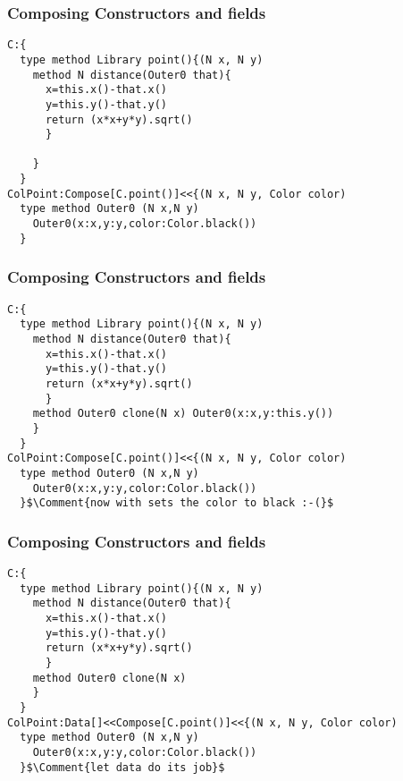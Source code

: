 \begin{frame}[fragile]
\frametitle{Composing Constructors and fields}


\begin{NiceCode}{59ex}{0.9}
\begin{lstlisting}
C:{
  type method Library point(){(N x, N y)
    method N distance(Outer0 that){
      x=this.x()-that.x()
      y=this.y()-that.y()
      return (x*x+y*y).sqrt()
      }

    }
  }
ColPoint:Compose[C.point()]<<{(N x, N y, Color color)
  type method Outer0 (N x,N y)
    Outer0(x:x,y:y,color:Color.black())
  }
\end{lstlisting}
\end{NiceCode}
\end{frame}

\begin{frame}[fragile]
\frametitle{Composing Constructors and fields}
\addtocounter{framenumber}{-1}

\begin{NiceCode}{59ex}{0.9}
\begin{lstlisting}
C:{
  type method Library point(){(N x, N y)
    method N distance(Outer0 that){
      x=this.x()-that.x()
      y=this.y()-that.y()
      return (x*x+y*y).sqrt()
      }
    method Outer0 clone(N x) Outer0(x:x,y:this.y())
    }
  }
ColPoint:Compose[C.point()]<<{(N x, N y, Color color)
  type method Outer0 (N x,N y)
    Outer0(x:x,y:y,color:Color.black())
  }$\Comment{now with sets the color to black :-(}$
\end{lstlisting}
\end{NiceCode}
\end{frame}

\begin{frame}[fragile]
\frametitle{Composing Constructors and fields}
\addtocounter{framenumber}{-1}

\begin{NiceCode}{59ex}{0.9}
\begin{lstlisting}
C:{
  type method Library point(){(N x, N y)
    method N distance(Outer0 that){
      x=this.x()-that.x()
      y=this.y()-that.y()
      return (x*x+y*y).sqrt()
      }
    method Outer0 clone(N x)
    }
  }
ColPoint:Data[]<<Compose[C.point()]<<{(N x, N y, Color color)
  type method Outer0 (N x,N y)
    Outer0(x:x,y:y,color:Color.black())
  }$\Comment{let data do its job}$
\end{lstlisting}
\end{NiceCode}
\end{frame}


